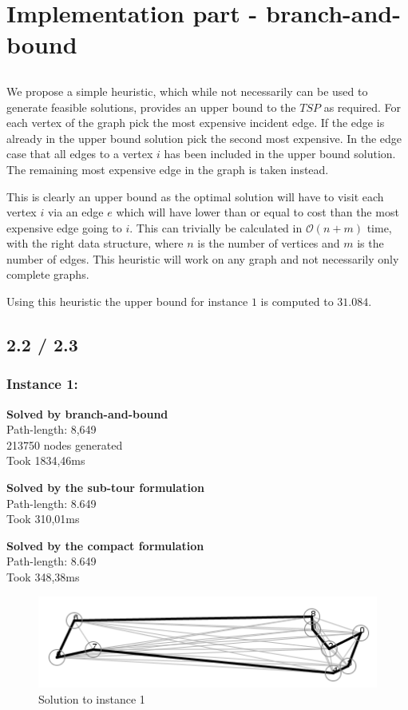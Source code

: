 \section{Implementation part - branch-and-bound}
\subsection{}
We propose a simple heuristic, which while not necessarily can be used to generate feasible solutions, provides an upper bound to the $TSP$ as required. For each vertex of the graph pick the most expensive incident edge. If the edge is already in the upper bound solution pick the second most expensive. In the edge case that all edges to a vertex $i$ has been included in the upper bound solution. The remaining most expensive edge in the graph is taken instead.

This is clearly an upper bound as the optimal solution will have to visit each vertex $i$ via an edge $e$ which will have lower than or equal to cost than the most expensive edge going to $i$. This can trivially be calculated in $\mathcal{O}(n+m)$ time, with the right data structure, where $n$ is the number of vertices and $m$ is the number of edges. This heuristic will work on any graph and not necessarily only complete graphs.

Using this heuristic the upper bound for instance $1$ is computed to $31.084$.

\subsection*{2.2 / 2.3}
\subsubsection*{Instance 1:}

\newpar \textbf{Solved by branch-and-bound}\\
Path-length: 8,649\\
213750 nodes generated\\
Took 1834,46ms

\newpar \textbf{Solved by the sub-tour formulation}\\
Path-length: 8.649\\
Took 310,01ms

\newpar \textbf{Solved by the compact formulation}\\
Path-length: 8.649\\
Took 348,38ms

\begin{figure}[H]
	\includegraphics[width=.9\textwidth]{figures/Instance1Solution.png}
	\caption{Solution to instance 1}
	\label{solution:1}
\end{figure}

